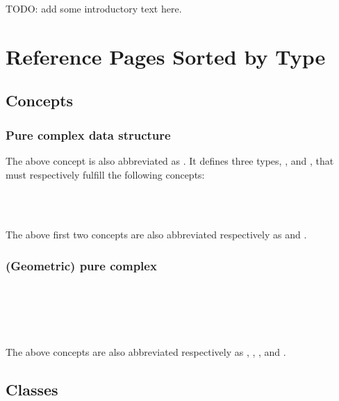 

TODO: add some introductory text here.

\section{Reference Pages Sorted by Type}

\subsection*{Concepts}

\subsubsection*{Pure complex data structure}


The above concept is also abbreviated as . It defines three types,
,  and , that must respectively fulfill the
following concepts:

\\
\\

The above first two concepts are also abbreviated respectively as
 and .

\subsubsection*{(Geometric) pure complex}

\\
\\

\\

The above concepts are also abbreviated respectively as ,
, ,  and .

\subsection*{Classes}

